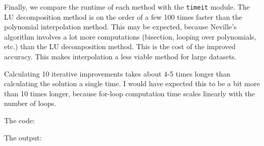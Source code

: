 Finally, we compare the runtime of each method with the \texttt{timeit} module. The LU decomposition method
is on the order of a few 100 times faster than the polynomial interpolation method. This may be expected,
because Neville's algorithm involves a lot more computations (bisection, looping over polynomials, etc.) 
than the LU decomposition method. This is the cost of the improved accuracy. This makes interpolation
a less viable method for large datasets.

Calculating 10 iterative improvements takes about 4-5 times longer than calculating the solution a single time.
I would have expected this to be a bit more than 10 times longer, because for-loop computation time scales 
linearly with the number of loops.

\noindent The code:



\noindent The output:



